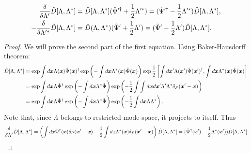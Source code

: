 \begin{lemma}
\begin{equation*}
\begin{split}
	\frac{\delta}{\delta \Lambda^\prime} \hat{D}[\Lambda, \Lambda^*]
	& = \hat{D}[\Lambda, \Lambda^*] (\hat{\Psi}^{\prime\dagger} + \frac{1}{2} \Lambda^{\prime*})
	= (\hat{\Psi}^{\prime\dagger} - \frac{1}{2} \Lambda^{\prime*}) \hat{D}[\Lambda, \Lambda^*], \\
	-\frac{\delta}{\delta \Lambda^{\prime*}} \hat{D}[\Lambda, \Lambda^*]
	& = \hat{D}(\Lambda, \Lambda^*) (\hat{\Psi}^\prime + \frac{1}{2} \Lambda^\prime)
	= (\hat{\Psi}^\prime - \frac{1}{2} \Lambda^\prime) \hat{D}[\Lambda, \Lambda^*].
\end{split}
\end{equation*}
\end{lemma}
\begin{proof}
We will prove the second part of the first equation.
Using Baker-Hausdorff theorem:
\begin{equation*}
\begin{split}
	\hat{D}[\Lambda, \Lambda^*]
	& = \exp \int d\boldsymbol{x} \Lambda(\boldsymbol{x}) \hat{\Psi}(\boldsymbol{x})^\dagger
		\exp \left( -\int d\boldsymbol{x} \Lambda^*(\boldsymbol{x}) \hat{\Psi}(\boldsymbol{x}) \right)
		\exp \frac{1}{2} \left[
			\int d\boldsymbol{x}^\prime \Lambda(\boldsymbol{x}^\prime) \hat{\Psi}(\boldsymbol{x}^\prime)^\dagger,
			\int d\boldsymbol{x} \Lambda^*(\boldsymbol{x}) \hat{\Psi}(\boldsymbol{x})
		\right] \\
	& = \exp \int d\boldsymbol{x} \Lambda \hat{\Psi}^\dagger
		\exp \left( -\int d\boldsymbol{x} \Lambda^* \hat{\Psi} \right)
		\exp \left(
			-\frac{1}{2} \int \int d\boldsymbol{x} d\boldsymbol{x}^\prime
			\Lambda^\prime \Lambda^* \delta_P(\boldsymbol{x}^\prime - \boldsymbol{x})
		\right) \\
	& = \exp \int d\boldsymbol{x} \Lambda \hat{\Psi}^\dagger
		\exp \left( -\int d\boldsymbol{x} \Lambda^* \hat{\Psi} \right)
		\exp \left(
			-\frac{1}{2} \int d\boldsymbol{x} \Lambda \Lambda^*
		\right).
\end{split}
\end{equation*}
Note that, since $\Lambda$ belongs to restricted mode space, it projects to itself.
Thus
\begin{equation*}
\begin{split}
	\frac{\delta}{\delta \Lambda^\prime} \hat{D}[\Lambda, \Lambda^*]
	= \left(
		\int dx \hat{\Psi}^\dagger(\boldsymbol{x}) \delta_P(\boldsymbol{x}^\prime - \boldsymbol{x})
		- \frac{1}{2} \int dx \Lambda^*(\boldsymbol{x}) \delta_P(\boldsymbol{x}^\prime - \boldsymbol{x})
	\right) \hat{D}[\Lambda, \Lambda^*]
	= (\hat{\Psi}^\dagger(\boldsymbol{x}^\prime) - \frac{1}{2} \Lambda^*(\boldsymbol{x}^\prime)) \hat{D}[\Lambda, \Lambda^*]
	\qedhere
\end{split}
\end{equation*}
\end{proof}

